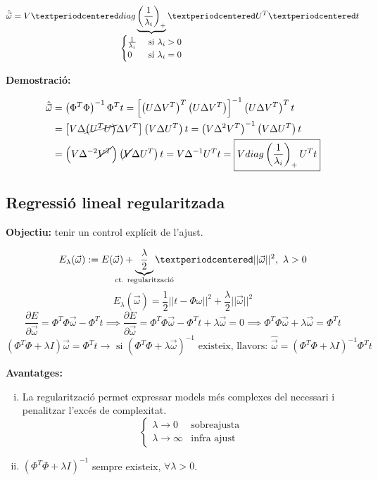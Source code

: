 \documentclass[a4paper]{article}
\begin{document}
$$
\hat{\vec{\omega}} = V · diag \underbrace{\left( \frac{1}{\lambda_i}\right)_+}_{
	\mathclap{
		\begin{cases}
			\frac{1}{\lambda_i} &\text{ si } \lambda_i > 0 \\
			0 & \text{ si } \lambda_i = 0
		\end{cases}}} · U^T · t
$$

\textbf{Demostració:}

\begin{align*}
\hat{\vec{\omega}} &= \left( \Phi^T \Phi \right)^{-1} \Phi^T t =
\left[ \left( U \Delta V^T \right)^T \left( U\Delta V^T \right) \right]^{-1}
\left(U\Delta V^T\right)^T t \\
& = \left[ V\Delta \cancel{\left( U^T U \right)} \Delta V^T \right] 
\left( V \Delta U^T \right) t = 
\left( V \Delta^2 V^T \right)^{-1} \left( V \Delta U^T \right) t \\ 
&=
\left( V \Delta^{-2} \cancel{V^T} \right) \left( \cancel{V} \Delta U^T \right) t = V \Delta^{-1} U^T t = 
\boxed{V diag\left(\frac{1}{\lambda_i}\right)_+ U^T t}
\end{align*}

\subsection{Regressió lineal regularitzada}

\textbf{Objectiu:} tenir un control explícit de l'ajust.

$$
E_{\lambda} (\vec{\omega}) := E(\vec{\omega}) + \underbrace{\frac{\lambda}{2}}_{\mathclap{\text{ct. regularització}}}·||\vec{\omega}||^2, \ \lambda > 0
$$
$$
E_{\lambda}(\vec{\omega}) = \frac{1}{2} || t - \Phi \omega ||^2 + \frac{\lambda}{2} || \vec{\omega} ||^2
$$
$$
\frac{\partial E}{\partial \vec{\omega}} = 
\Phi^T \Phi \vec{\omega} - \Phi^T t \implies
\frac{\partial E}{\partial \vec{\omega}} = 
\Phi^T \Phi \vec{\omega} - \Phi^T t + \lambda \vec{\omega} = 0 \implies
\Phi^T \Phi \vec{\omega} + \lambda \vec{\omega} = \Phi^T t
$$
$$
\left( \Phi^T \Phi + \lambda I \right) \vec{\omega} = \Phi^T t \rightarrow
\text{ si } \left( \Phi^T \Phi + \lambda \vec{\omega} \right)^{-1} 
\text{ existeix, llavors: } \hat{\vec{\omega}} = 
\left( \Phi^T \Phi + \lambda I \right)^{-1} \Phi^T t
$$

\textbf{Avantatges:}

\begin{enumerate}[i)]
	\item La regularització permet expressar models més complexes del necessari i penalitzar l'excés de complexitat.
	$$
	\begin{cases}
		\lambda \rightarrow 0 &\text{sobreajusta} \\
		\lambda \rightarrow \infty &\text{infra ajust}
	\end{cases}
	$$
	
	\item $\left( \Phi^T \Phi + \lambda I \right)^{-1}$ sempre existeix, $\forall \lambda > 0$.
\end{enumerate}
\end{document}
